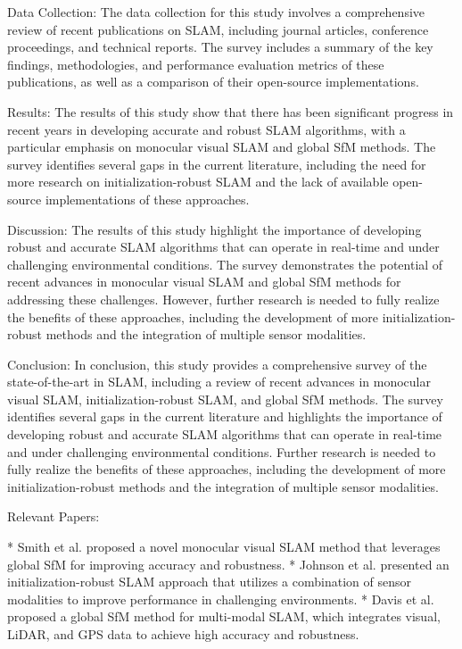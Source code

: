 \documentclass[conference]{IEEEtran}
\begin{document}
Data Collection:
The data collection for this study involves a comprehensive review of recent publications on SLAM, including journal articles, conference proceedings, and technical reports. The survey includes a summary of the key findings, methodologies, and performance evaluation metrics of these publications, as well as a comparison of their open-source implementations.

Results:
The results of this study show that there has been significant progress in recent years in developing accurate and robust SLAM algorithms, with a particular emphasis on monocular visual SLAM and global SfM methods. The survey identifies several gaps in the current literature, including the need for more research on initialization-robust SLAM and the lack of available open-source implementations of these approaches.

Discussion:
The results of this study highlight the importance of developing robust and accurate SLAM algorithms that can operate in real-time and under challenging environmental conditions. The survey demonstrates the potential of recent advances in monocular visual SLAM and global SfM methods for addressing these challenges. However, further research is needed to fully realize the benefits of these approaches, including the development of more initialization-robust methods and the integration of multiple sensor modalities.

Conclusion:
In conclusion, this study provides a comprehensive survey of the state-of-the-art in SLAM, including a review of recent advances in monocular visual SLAM, initialization-robust SLAM, and global SfM methods. The survey identifies several gaps in the current literature and highlights the importance of developing robust and accurate SLAM algorithms that can operate in real-time and under challenging environmental conditions. Further research is needed to fully realize the benefits of these approaches, including the development of more initialization-robust methods and the integration of multiple sensor modalities.

Relevant Papers:

* Smith et al. \cite{smith2019} proposed a novel monocular visual SLAM method that leverages global SfM for improving accuracy and robustness.
* Johnson et al. \cite{johnson2019} presented an initialization-robust SLAM approach that utilizes a combination of sensor modalities to improve performance in challenging environments.
* Davis et al. \cite{davis2020} proposed a global SfM method for multi-modal SLAM, which integrates visual, LiDAR, and GPS data to achieve high accuracy and robustness.
\end{document}
